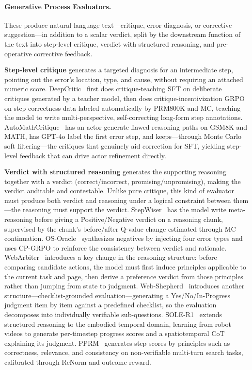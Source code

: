 \paragraph{Generative Process Evaluators.} These produce natural-language text---critique, error diagnosis, or corrective suggestion---in addition to a scalar verdict, split by the downstream function of the text into step-level critique, verdict with structured reasoning, and pre-operative corrective feedback.

\textbf{Step-level critique} generates a targeted diagnosis for an intermediate step, pointing out the error's location, type, and cause, without requiring an attached numeric score. DeepCritic~\cite{Yan25u} first does critique-teaching SFT on deliberate critiques generated by a teacher model, then does critique-incentivization GRPO on step-correctness data labeled automatically by PRM800K and MC, teaching the model to write multi-perspective, self-correcting long-form step annotations. AutoMathCritique~\cite{Xi24} has an actor generate flawed reasoning paths on GSM8K and MATH, has GPT-4o label the first error step, and keeps---through Monte Carlo soft filtering---the critiques that genuinely aid correction for SFT, yielding step-level feedback that can drive actor refinement directly.

\textbf{Verdict with structured reasoning} generates the supporting reasoning together with a verdict (correct/incorrect, promising/unpromising), making the verdict auditable and contestable. Unlike pure critique, this kind of evaluator must produce both verdict and reasoning under a logical constraint between them---the reasoning must support the verdict. StepWiser~\cite{Xio25c} has the model write meta-reasoning before giving a Positive/Negative verdict on a reasoning chunk, supervised by the chunk's before/after Q-value change estimated through MC continuation. OS-Oracle~\cite{Wu25m} synthesizes negatives by injecting four error types and uses CP-GRPO to reinforce the consistency between verdict and rationale. WebArbiter~\cite{Zha26ab} introduces a key change in the reasoning structure: before comparing candidate actions, the model must first induce principles applicable to the current task and page, then derive a preference verdict from those principles rather than jumping from state to judgment. Web-Shepherd~\cite{Cha25b} introduces another structure---checklist-grounded evaluation---generating a Yes/No/In-Progress judgment item by item against a predefined checklist, so the evaluation decomposes into individually verifiable sub-questions. SOLE-R1~\cite{Sch26} extends structured reasoning to the embodied temporal domain, learning from robot videos to generate per-timestep progress scores and a spatiotemporal CoT explaining its judgment. PPRM~\cite{Xu25h} generates step scores by principles such as correctness, relevance, and consistency on non-verifiable multi-turn search tasks, calibrated through ReNorm and outcome reward.

